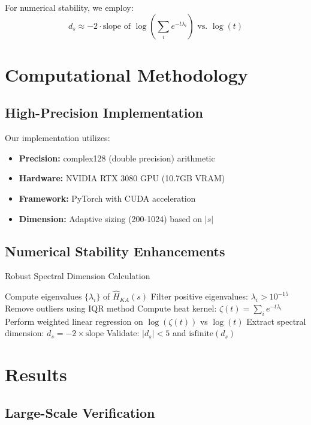 \documentclass[11pt]{article}
\begin{document}
For numerical stability, we employ:
\begin{equation}
d_s \approx -2 \cdot \text{slope of } \log(\sum_i e^{-t\lambda_i}) \text{ vs. } \log(t)
\end{equation}

\section{Computational Methodology}

\subsection{High-Precision Implementation}

Our implementation utilizes:
\begin{itemize}
\item \textbf{Precision:} complex128 (double precision) arithmetic
\item \textbf{Hardware:} NVIDIA RTX 3080 GPU (10.7GB VRAM)
\item \textbf{Framework:} PyTorch with CUDA acceleration
\item \textbf{Dimension:} Adaptive sizing (200-1024) based on $|s|$
\end{itemize}

\subsection{Numerical Stability Enhancements}

\begin{algorithm}
\caption{Robust Spectral Dimension Calculation}
\begin{algorithmic}[1]
\STATE Compute eigenvalues $\{\lambda_i\}$ of $\hat{H}_{KA}(s)$
\STATE Filter positive eigenvalues: $\lambda_i > 10^{-15}$
\STATE Remove outliers using IQR method
\STATE Compute heat kernel: $\zeta(t) = \sum_i e^{-t\lambda_i}$
\STATE Perform weighted linear regression on $\log(\zeta(t))$ vs $\log(t)$
\STATE Extract spectral dimension: $d_s = -2 \times \text{slope}$
\STATE Validate: $|d_s| < 5$ and $\text{isfinite}(d_s)$
\end{algorithmic}
\end{algorithm}

\section{Results}

\subsection{Large-Scale Verification}
\end{document}
